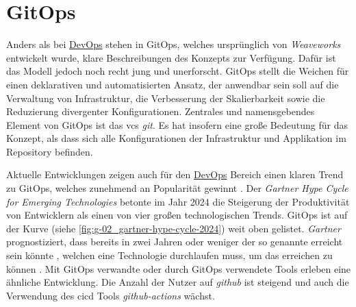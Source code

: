 \section{GitOps}
\label{sec:03-03_gitops}

Anders als bei \hyperref[sec:03-01_devops]{DevOps} stehen in GitOps, welches ursprünglich von \textit{Weaveworks} entwickelt wurde, klare Beschreibungen des Konzepts zur Verfügung. Dafür ist das Modell jedoch noch recht jung und unerforscht. \cite{009:GitOps-Evolution-of-DevOps} GitOps stellt die Weichen für einen deklarativen und automatisierten Ansatz, der anwendbar sein soll auf die Verwaltung von Infrastruktur, die Verbesserung der Skalierbarkeit sowie die Reduzierung divergenter Konfigurationen. Zentrales und namensgebendes Element von GitOps ist das \Gls{vcs} \textit{\Gls{git}}. Es hat insofern eine große Bedeutung für das Konzept, als dass sich alle Konfigurationen der Infrastruktur und Applikation im Repository befinden. \cite{024:Investiugating-Impact-of-Containerization-on-Deployment-Process-in-DevOps}

Aktuelle Entwicklungen zeigen auch für den \hyperref[sec:03-01_devops]{DevOps} Bereich einen klaren Trend zu GitOps, welches zunehmend an Popularität gewinnt \cite{024:Investiugating-Impact-of-Containerization-on-Deployment-Process-in-DevOps}. Der \textit{Gartner Hype Cycle for Emerging Technologies} betonte im Jahr 2024 die Steigerung der Produktivität von Entwicklern als einen von vier großen technologischen Trends. GitOps ist auf der Kurve (siehe \autoref{fig:g-02_gartner-hype-cycle-2024}) weit oben gelistet. \textit{Gartner} prognostiziert, dass bereits in zwei Jahren oder weniger der so genannte  erreicht sein könnte \cite{106:Gartner-2024-Hype-Cycle-for-Emerging-Technologies}, welchen eine Technologie durchlaufen muss, um das  erreichen zu können \cite{108:Gartner-Hype-Cycle}. Mit GitOps verwandte oder durch GitOps verwendete Tools erleben eine ähnliche Entwicklung. Die Anzahl der Nutzer auf \textit{\Gls{github}} ist steigend und auch die Verwendung des \Gls{cicd} Tools \textit{\Gls{github-actions}} wächst. \cite{008:GitOps-Approach-to-Cloud-Cluster-System-Deployment}

